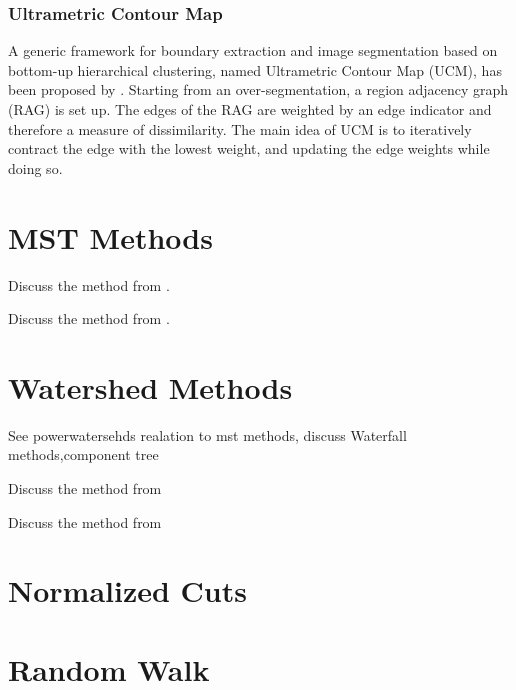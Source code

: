 \subsubsection{Ultrametric Contour Map}\label{sec:hc_ucm}

A generic framework for boundary extraction and image segmentation based
on bottom-up hierarchical clustering, named Ultrametric Contour Map (UCM), 
has been proposed by \citet{arbelaez_2006_cvpr} . 
Starting from an over-segmentation, a region adjacency graph (RAG) is set up.
The edges of the RAG are weighted by an edge indicator and therefore a measure  of dissimilarity.
The main idea of UCM is to iteratively contract the edge with the lowest weight, 
and updating the edge weights while doing so.

\section{MST Methods}\label{sec:rw_mst_methods}


Discuss the method from \citet{felzenszwalb_2004_ijcv}.


Discuss the method from \citet{Straehle_k-smallestspanning}.



\section{Watershed Methods}

See powerwatersehds realation to mst methods,
discuss Waterfall methods,component tree

Discuss the method from \citet{straehle_2011_miccai}


Discuss the method from \citet{straehle_2012_cvpr}


\section{Normalized Cuts}


\section{Random Walk}